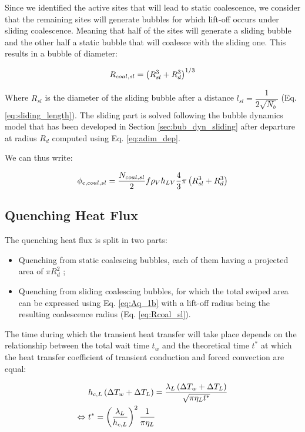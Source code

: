 Since we identified the active sites that will lead to static coalescence, we consider that the remaining sites will generate bubbles for which lift-off occurs under sliding coalescence. Meaning that half of the sites will generate a sliding bubble and the other half a static bubble that will coalesce with the sliding one. This results in a bubble of diameter:

\begin{equation}
R_{coal,sl} = \left( R_{sl}^{3}+R_{d}^{3} \right)^{1/3}
\label{eq:Rcoal_sl}
\end{equation}

Where $R_{sl}$ is the diameter of the sliding bubble after a distance $l_{sl} = \dfrac{1}{2\sqrt{N_{b}}}$ (Eq. \ref{eq:sliding_length}). The sliding part is solved following the bubble dynamics model that has been developed in Section \ref{sec:bub_dyn_sliding} after departure at radius $R_{d}$ computed using Eq. \ref{eq:adim_dep}.

\npar

We can thus write:

\begin{equation}
\phi_{e,coal,sl} = \frac{N_{coal,sl}}{2}f \rho_{V} h_{LV} \frac{4}{3} \pi \left( R_{sl}^{3} + R_{d}^{3} \right)
\end{equation}

\subsection{Quenching Heat Flux}

The quenching heat flux is split in two parts:

\begin{itemize}
\item Quenching from static coalescing bubbles, each of them having a projected area of $\pi R_{d}^{2}$ ;
\item Quenching from sliding coalescing bubbles, for which the total swiped area can be expressed using Eq. \ref{eq:Aq_1b} with a lift-off radius being the resulting coalescence radius (Eq. \ref{eq:Rcoal_sl}).
\end{itemize}


The time during which the transient heat transfer will take place depends on the relationship between the total wait time $t_{w}$ and the theoretical time $t^{*}$ at which the heat transfer coefficient of transient conduction and forced convection are equal:

\begin{align}
&h_{c,L}\left( \Delta T_{w} + \Delta T_{L} \right) = \frac{\lambda_{L}\left( \Delta T_{w} + \Delta T_{L} \right)}{\sqrt{\pi\eta_{L}t^{*}}}\\
\Leftrightarrow\  &t^{*} = \left( \frac{\lambda_{L}}{h_{c,L}} \right)^{2}\frac{1}{\pi \eta_{L}}
\label{eq:tstar}
\end{align}

